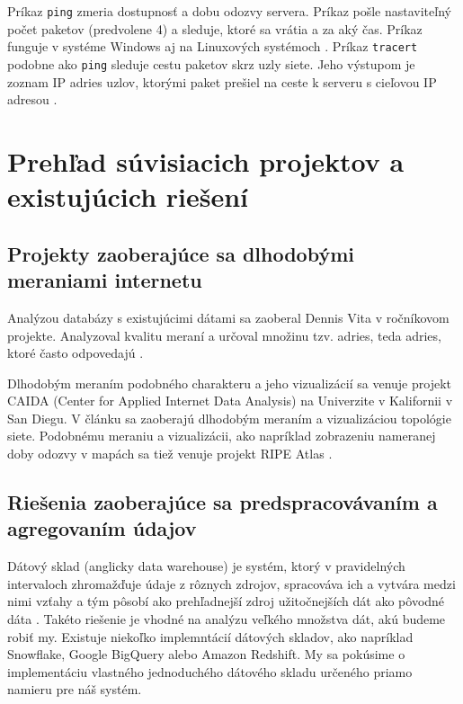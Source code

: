 Príkaz \lstinline{ping} zmeria dostupnosť a dobu odozvy servera. Príkaz pošle nastaviteľný počet paketov (predvolene 4) a sleduje, 
ktoré sa vrátia a za aký čas. Príkaz funguje v systéme Windows \cite{ping_windows} aj na Linuxových systémoch \cite{ping_linux}.
Príkaz \lstinline{tracert} podobne ako \lstinline{ping} sleduje cestu paketov skrz uzly siete. Jeho výstupom je zoznam IP adries uzlov, ktorými paket prešiel 
na ceste k serveru s cieľovou IP adresou \cite{tracert}. 

\section{Prehľad súvisiacich projektov a existujúcich riešení}

\subsection{Projekty zaoberajúce sa dlhodobými meraniami internetu}

Analýzou databázy s existujúcimi dátami sa zaoberal Dennis Vita v ročníkovom projekte. Analyzoval kvalitu meraní a určoval množinu tzv.  
adries, teda adries, ktoré často odpovedajú \cite{vita_report}.

Dlhodobým meraním podobného charakteru a jeho vizualizácií sa venuje projekt CAIDA (Center for Applied Internet Data Analysis) na Univerzite 
v Kalifornii v San Diegu. V článku \cite{caida} sa zaoberajú dlhodobým meraním a vizualizáciou topológie siete. Podobnému meraniu a vizualizácii, 
ako napríklad zobrazeniu nameranej doby odozvy v mapách sa tiež venuje projekt RIPE Atlas \cite{atlas_ripe}.

\subsection{Riešenia zaoberajúce sa predspracovávaním a agregovaním údajov}

Dátový sklad (anglicky data warehouse) je systém, ktorý v pravidelných intervaloch zhromažďuje údaje z rôznych zdrojov, 
spracováva ich a vytvára medzi nimi vzťahy a tým pôsobí ako prehľadnejší zdroj užitočnejších dát ako pôvodné dáta \cite{data_warehouse}. 
Takéto riešenie je vhodné na analýzu veľkého množstva dát, akú budeme robiť my. Existuje niekoľko implemntácií 
dátových skladov, ako napríklad Snowflake, Google BigQuery alebo Amazon Redshift. My sa pokúsime o implementáciu vlastného jednoduchého 
dátového skladu určeného priamo namieru pre náš systém.